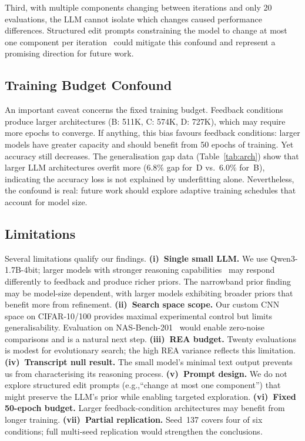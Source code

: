 \documentclass[10pt]{article}
\newcommand{\eg}{e.g.,\xspace}
\begin{document}
Third, with multiple components changing between iterations and only 20
evaluations, the LLM cannot isolate which changes caused performance
differences.  Structured edit prompts constraining the model to change at most
one component per iteration~\citep{madaan2023selfrefine} could mitigate this
confound and represent a promising direction for future work.

\subsection{Training Budget Confound}

An important caveat concerns the fixed training budget.  Feedback conditions
produce larger architectures (B: 511K, C: 574K, D: 727K), which may require
more epochs to converge.  If anything, this bias favours feedback conditions:
larger models have greater capacity and should benefit from 50 epochs of
training.  Yet accuracy still decreases.  The generalisation gap data
(Table~\ref{tab:arch}) show that larger LLM architectures overfit more
($6.8\%$ gap for~D vs.\ $6.0\%$ for~B), indicating the accuracy loss is not
explained by underfitting alone.  Nevertheless, the confound is real: future
work should explore adaptive training schedules that account for model size.

\subsection{Limitations}
\label{sec:limitations}

Several limitations qualify our findings.  \textbf{(i)~Single small LLM.}  We
use Qwen3-1.7B-4bit; larger models with stronger reasoning
capabilities~\citep{openai2023gpt4} may respond differently to feedback and
produce richer priors.  The narrowband prior finding may be model-size
dependent, with larger models exhibiting broader priors that benefit more from
refinement.  \textbf{(ii)~Search space scope.}  Our custom CNN space on
CIFAR-10/100 provides maximal experimental control but limits generalisability.
Evaluation on NAS-Bench-201~\citep{dong2020nasbench201} would enable zero-noise
comparisons and is a natural next step.  \textbf{(iii)~REA budget.}  Twenty
evaluations is modest for evolutionary search; the high REA variance reflects
this limitation.  \textbf{(iv)~Transcript null result.}  The small model's
minimal text output prevents us from characterising its reasoning process.
\textbf{(v)~Prompt design.}  We do not explore structured edit prompts
(\eg ``change at most one component'') that might preserve the LLM's prior
while enabling targeted exploration.  \textbf{(vi)~Fixed 50-epoch budget.}
Larger feedback-condition architectures may benefit from longer training.
\textbf{(vii)~Partial replication.}  Seed~137 covers four of six conditions;
full multi-seed replication would strengthen the conclusions.
\end{document}

